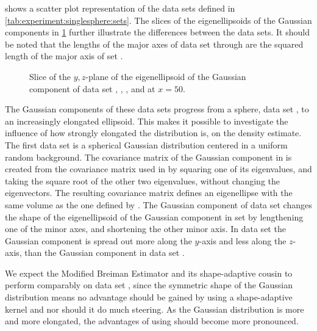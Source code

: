 
 shows a scatter plot representation of the data sets defined in \cref{tab:experiment:singlesphere:sets}. The slices of the eigenellipsoids of the Gaussian components in \cref{fig:experiment:singlesphere:projection} further illustrate the differences between the data sets. It should be noted that the lengths of the major axes of data set \baakmanOne through \baakmanFive are the squared length of the major axis of set \ferdosiOne.

\begin{figure}[b!]
	\centering
	
	\caption{Slice of the $y,z$-plane of the eigenellipsoid of the Gaussian component of data set%
		 \ferdosiOne, %
		 \baakmanOne, %
		 \baakmanFour, and %
		 \baakmanFive %
		 at $x = 50$.}
	\label{fig:experiment:singlesphere:projection}
\end{figure}

The Gaussian components of these data sets progress from a sphere, \ie data set \ferdosiOne, to an increasingly elongated ellipsoid. This makes it possible to investigate the influence of how strongly elongated the distribution is, on the density estimate.
	The first data set is a spherical Gaussian distribution centered in a uniform random background.
	The covariance matrix of the Gaussian component in \baakmanOne is created from the covariance matrix used in \ferdosiOne by squaring one of its eigenvalues, and taking the square root of the other two eigenvalues, without changing the eigenvectors. The resulting covariance matrix defines an eigenellipse with the same volume as the one defined by \ferdosiOne.
	The Gaussian component of data set \baakmanFour changes the shape of the eigenellipsoid of the Gaussian component in set \ferdosiOne by lengthening one of the minor axes, and shortening the other minor axis.
	In data set \baakmanFive the Gaussian component is spread out more along the $y$-axis and less along the $z$-axis, than the Gaussian component in data set \baakmanFour.

	We expect the Modified Breiman Estimator and its shape-adaptive cousin to perform comparably on data set \ferdosiOne, since the symmetric shape of the Gaussian distribution means no advantage should be gained by using a shape-adaptive kernel and nor should it do much steering.
	As the Gaussian distribution is more and more elongated, the advantages of using \sambe should become more pronounced.